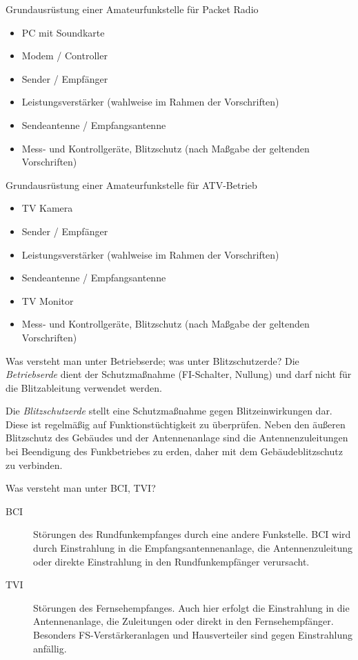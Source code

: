 \documentclass[avery5371,grid,frame,a4paper]{flashcards}
\newcommand{\card}[3]{
  \begin{flashcard}[{\chap} -- #1]{#2}#3\end{flashcard}
}
\begin{document}
\card{39}{Grundausrüstung einer Amateurfunkstelle für Packet Radio}{
  \begin{itemize}\itemsep1pt
    \item PC mit Soundkarte
    \item Modem / Controller
    \item Sender / Empfänger
    \item Leistungsverstärker (wahlweise im Rahmen der Vorschriften)
    \item Sendeantenne / Empfangsantenne
    \item Mess- und Kontrollgeräte, Blitzschutz (nach Maßgabe der geltenden Vorschriften)
  \end{itemize}
}
\card{40}{Grundausrüstung einer Amateurfunkstelle für ATV-Betrieb}{
  \begin{itemize}\itemsep1pt
    \item TV Kamera
    \item Sender / Empfänger
    \item Leistungsverstärker (wahlweise im Rahmen der Vorschriften)
    \item Sendeantenne / Empfangsantenne
    \item TV Monitor
    \item Mess- und Kontrollgeräte, Blitzschutz (nach Maßgabe der geltenden Vorschriften)
  \end{itemize}
}
\card{41}{Was versteht man unter Betriebserde; was unter Blitzschutzerde?}{
  Die \emph{Betriebserde} dient der Schutzmaßnahme (FI-Schalter, Nullung) und darf nicht für die Blitzableitung verwendet werden.

  Die \emph{Blitzschutzerde} stellt eine Schutzmaßnahme gegen Blitzeinwirkungen dar. Diese ist regelmäßig auf Funktionstüchtigkeit zu überprüfen. Neben den äußeren Blitzschutz des Gebäudes und der Antennenanlage sind die Antennenzuleitungen bei Beendigung des Funkbetriebes zu erden, daher mit dem Gebäudeblitzschutz zu verbinden.
}
\card{42}{Was versteht man unter BCI, TVI?}{
  \begin{description}
    \item[BCI] Störungen des Rundfunkempfanges durch eine andere Funkstelle. BCI wird durch Einstrahlung in die Empfangsantennenanlage, die Antennenzuleitung oder direkte Einstrahlung in den Rundfunkempfänger verursacht.
    \item[TVI] Störungen des Fernsehempfanges. Auch hier erfolgt die Einstrahlung in die Antennenanlage, die Zuleitungen oder direkt in den Fernsehempfänger. Besonders FS-Verstärkeranlagen und Hausverteiler sind gegen Einstrahlung anfällig.
  \end{description}
}
\end{document}
